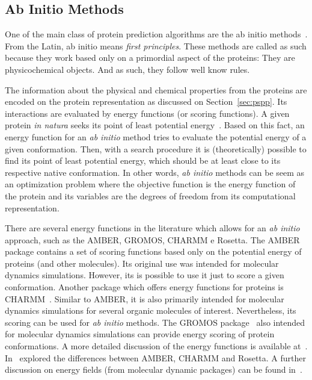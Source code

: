 \subsection{Ab Initio Methods}\label{sec:ab-initio}

One of the main class of protein prediction algorithms are the ab initio
methods~\cite{lee2017ab}. From the Latin, ab initio means \textit{first principles}. These methods are called as such because they work based only on a primordial aspect of the proteins: They are physicochemical objects. And as such, they follow well know rules.

The information about the physical and chemical properties from the proteins are encoded on the protein representation as discussed on Section~\ref{sec:pspp}. Its interactions are evaluated by energy functions (or scoring functions). A given protein \textit{in natura} seeks its point of least potential energy~\cite{anfinsen1973principles}. Based on this fact, an energy function for an \textit{ab initio} method tries to evaluate the potential energy of a given conformation. Then, with a search procedure it is (theoretically) possible to find its point of least potential energy, which should be at least close to its respective native conformation. In other words, \textit{ab initio} methods can be seem as an optimization problem where the objective function is the energy function of the protein and
its variables are the degrees of freedom from its computational representation.

There are several energy functions in the literature which allows for an
\textit{ab initio} approach, such as the \ac{AMBER}, \ac{GROMOS}, \ac{CHARMM} e Rosetta.
The \ac{AMBER}~\cite{salomon2013overview} package contains a set of scoring functions based only on the potential energy of proteins (and other molecules). Its original use was intended for molecular dynamics simulations. However, its is possible to use it just to score a given conformation. Another package which offers energy functions for proteins is \ac{CHARMM}~\cite{brooks2009charmm}. Similar to \ac{AMBER}, it is also primarily intended for molecular dynamics simulations for several organic molecules of interest. Nevertheless, its scoring can be used for \textit{ab initio} methods. The \ac{GROMOS} package~\cite{eichenberger2011gromos++} also intended for molecular dynamics simulations can provide energy scoring of protein conformations. A more detailed discussion of the energy functions is available at~\cite{dorn2014three}. In~\cite{narloch2016diversification} explored the differences between \ac{AMBER}, \ac{CHARMM} and Rosetta. A further discussion on energy fields (from molecular dynamic packages) can be found in~\cite{vlachakis2014current}.


